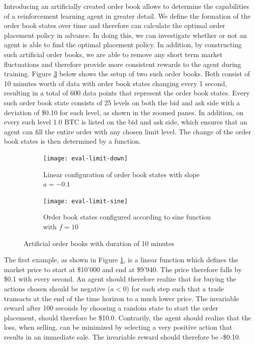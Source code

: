 Introducing an artificially created order book allows to determine the capabilities of a reinforcement learning agent in greater detail.
We define the formation of the order book states over time and therefore can calculate the optimal order placement policy in advance.
In doing this, we can investigate whether or not an agent is able to find the optimal placement policy.
In addition, by constructing such artificial order books, we are able to remove any short term market fluctuations and therefore provide more consistent rewards to the agent during training.
Figure \ref{fig:eval-limit-artificial} below shows the setup of two such order books.
Both consist of 10 minutes worth of data with order book states changing every 1 second, resulting in a total of 600 data points that represent the order book states.
Every such order book state consists of 25 levels on both the bid and ask side with a deviation of \$0.10 for each level, as shown in the zoomed panes.
In addition, on every such level 1.0 BTC is listed on the bid and ask side, which ensures that an agent can fill the entire order with any chosen limit level.
The change of the order book states is then determined by a function.
\begin{figure}[H]
    \centering
    \begin{subfigure}[b]{0.45\textwidth}
        \texttt{[image: eval-limit-down]}
        \caption{Linear configuration of order book states with slope $a=-0.1$}
        \label{fig:eval-limit-down}
    \end{subfigure}
    \begin{subfigure}[b]{0.45\textwidth}
        \texttt{[image: eval-limit-sine]}
        \caption{Order book states configured according to sine function with $f=10$}
        \label{fig:eval-limit-sine}
    \end{subfigure}
    \caption{Artificial order books with duration of 10 minutes}\label{fig:eval-limit-artificial}
\end{figure}

The first example, as shown in Figure \ref{fig:eval-limit-down}, is a linear function which defines the market price to start at \$10'000 and end at \$9'940.
The price therefore falls by \$0.1 with every second.
An agent should therefore realize that for buying the actions chosen should be negative ($a<0$) for each step such that a trade transacts at the end of the time horizon to a much lower price.
The invariable reward after 100 seconds by choosing a random state to start the order placement, should therefore be \$10.0.
Contrarily, the agent should realize that the loss, when selling, can be minimized by selecting a very positive action that results in an immediate sale.
The invariable reward should therefore be -\$0.10.

